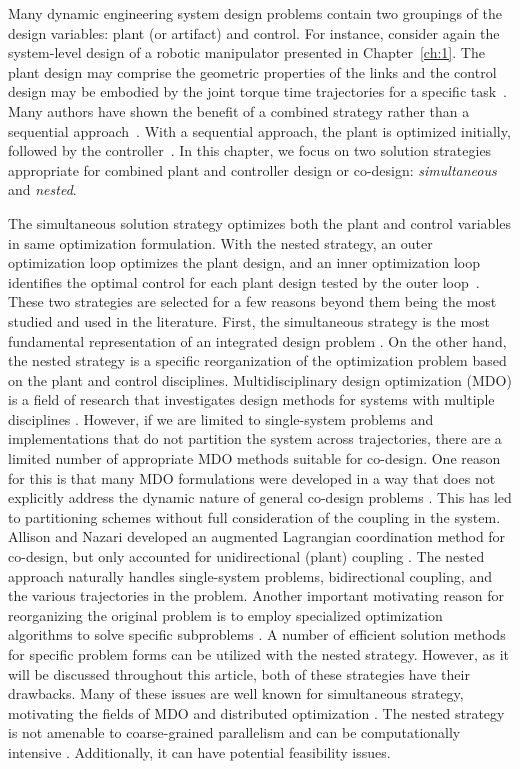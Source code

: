 Many dynamic engineering system design problems contain two groupings of the design variables: plant (or artifact) and control.
For instance, consider again the system-level design of a robotic manipulator presented in Chapter~\ref{ch:1}. The plant design may comprise the geometric properties of the links and the control design may be embodied by the joint torque time trajectories for a specific task~\cite{Allison2013d}.
Many authors have shown the benefit of a combined strategy rather than a sequential approach~\cite{Fathy2003a, Allison2014b, Deshmukh2016a, Yan2009a, Fathy2001a}.
With a sequential approach, the plant is optimized initially, followed by the controller~\cite{Fathy2001a, Allison2014a}. 
In this chapter, we focus on two solution strategies appropriate for combined plant and controller design or co-design: \textit{simultaneous} and \textit{nested}.

The simultaneous solution strategy optimizes both the plant and control variables in same optimization formulation.
With the nested strategy, an outer optimization loop optimizes the plant design, and an inner optimization loop identifies the optimal control for each plant design tested by the outer loop~\cite{Fathy2001a, Allison2014a}.
These two strategies are selected for a few reasons beyond them being the most studied and used in the literature.
First, the simultaneous strategy is the most fundamental representation of an integrated design problem \cite{Martins2013a}. 
On the other hand, the nested strategy is a specific reorganization of the optimization problem based on the plant and control disciplines.
Multidisciplinary design optimization (MDO) is a field of research that investigates design methods for systems with multiple disciplines \cite{Martins2013a, Allison2014a}.
However, if we are limited to single-system problems and implementations that do not partition the system across trajectories, there are a limited number of appropriate MDO methods suitable for co-design.
One reason for this is that many MDO formulations were developed in a way that does not explicitly address the dynamic nature of general co-design problems \cite{Allison2014a}.
This has led to partitioning schemes without full consideration of the coupling in the system.
Allison and Nazari developed an augmented Lagrangian coordination method for co-design, but only accounted for unidirectional (plant) coupling \cite{Allison2010b}.
The nested approach naturally handles single-system problems, bidirectional coupling, and the various trajectories in the problem.
Another important motivating reason for reorganizing the original problem is to employ specialized optimization algorithms to solve specific subproblems \cite{Allison2010b, Kusiak1995a}.
A number of efficient solution methods for specific problem forms can be utilized with the nested strategy.
However, as it will be discussed throughout this article, both of these strategies have their drawbacks. 
Many of these issues are well known for simultaneous strategy, motivating the fields of MDO and distributed optimization \cite{Martins2013a}.
The nested strategy is not amenable to coarse-grained parallelism and can be computationally intensive \cite{Allison2010b}.
Additionally, it can have potential feasibility issues.

